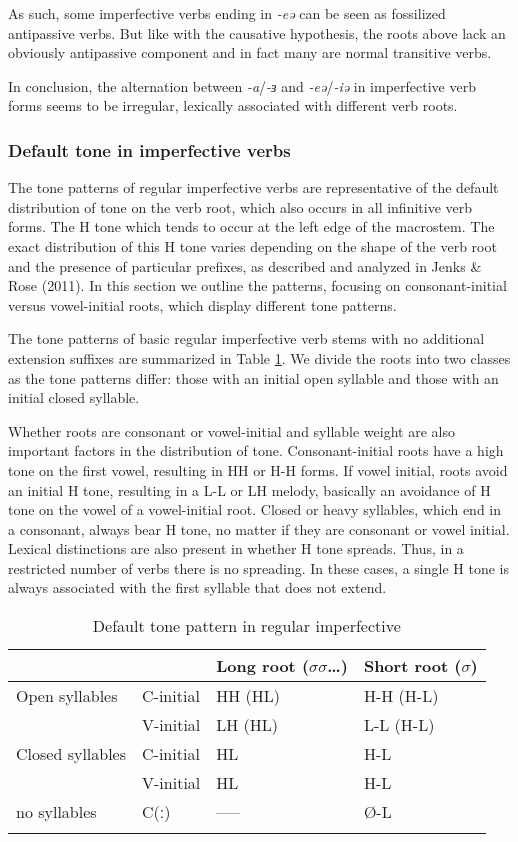 As such, some imperfective verbs ending in \textit{-eə} can be seen as fossilized antipassive verbs. But like with the causative hypothesis, the roots above lack an obviously antipassive component and in fact many are normal transitive verbs.

In conclusion, the alternation between \textit{-a}/\textit{-ɜ} and \textit{-eə}/\textit{-iə} in imperfective verb forms seems to be irregular, lexically associated with different verb roots.

\subsubsection{Default tone in imperfective verbs}\label{sec:ch11:defaulttone}

The tone patterns of regular imperfective verbs are representative of the default distribution of tone on the verb root, which also occurs in all infinitive verb forms. The H tone which tends to occur at the left edge of the macrostem. The exact distribution of this H tone varies depending on the shape of the verb root and the presence of particular prefixes, as described and analyzed in Jenks \& Rose (2011). In this section we outline the patterns, focusing on consonant-initial versus vowel-initial roots, which display different tone patterns.  

The tone patterns of basic regular imperfective verb stems with no additional extension suffixes are summarized in Table \ref{tab:ch11:5}. We divide the roots into two classes as the tone patterns differ: those with an initial open syllable and those with an initial closed syllable. 

Whether roots are consonant or vowel-initial and syllable weight are also important factors in the distribution of tone. Consonant-initial roots have a high tone on the first vowel, resulting in HH or H-H forms. If vowel initial, roots avoid an initial H tone, resulting in a L-L or LH melody, basically an avoidance of H tone on the vowel of a vowel-initial root. Closed or heavy syllables, which end in a consonant, always bear H tone, no matter if they are consonant or vowel initial. Lexical distinctions are also present in whether H tone spreads. Thus, in a restricted number of verbs there is no spreading. In these cases, a single H tone is always associated with the first syllable that does not extend.

 	\begin{table}
 		\begin{tabular}[t]{llll}
\lsptoprule
		&		& Long root ($\sigma\sigma${\ldots}) & 	Short root ($\sigma$) \\
\midrule
Open syllables	& C-initial	& HH  (HL) 	& 	H-H  (H-L)\\
 				& V-initial	& LH (HL)	& L-L (H-L) \\ 
\midrule 
Closed syllables	& C-initial	&	HL 	&	H-L\\
				& V-initial	&	HL	&	H-L\\
\midrule
no syllables	& C(ː)	& -----	& Ø-L  \\
\lspbottomrule
\end{tabular}
	\caption{Default tone pattern in regular imperfective}
		\label{tab:ch11:5}
\end{table}

